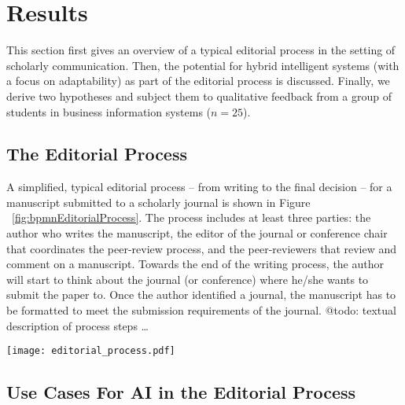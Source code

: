 \section{Results}
\label{sec:results}

This section first gives an overview of a typical editorial process in the setting of scholarly communication. Then, the potential
for hybrid intelligent systems (with a focus on adaptability) as part of the editorial process is discussed. Finally, we derive two
hypotheses and subject them to qualitative feedback from a group of students in business information systems ($n = 25$).

\subsection{The Editorial Process}

A simplified, typical editorial process -- from writing to the final decision -- for a manuscript submitted to a scholarly journal is shown in
Figure ~\ref{fig:bpmnEditorialProcess}. The process includes at least three parties: the author who writes the manuscript, the editor of the
journal or conference chair that coordinates the peer-review process, and the peer-reviewers that review and comment on a manuscript. Towards
the end of the writing process, the author will start to think about the journal (or conference) where he/she wants to submit the paper to.
Once the author identified a journal, the manuscript has to be formatted to meet the submission requirements of the journal. 
{\color{purple} @todo: textual description of process steps \dots}

\begin{figure*}[htb]
    \centering
    \texttt{[image: editorial\_process.pdf]}
    \caption{A simplified, typical editorial process from writing the manuscript to the final decision of acceptance or
    rejection for publication (in BPMN 2.0). For better understanding, the process steps performed by outside parties 
    are also modelled and the process starts with the outside party (author) writing the manuscript. The numbers
    indicate the sequence flow of the process.}
    \label{fig:bpmnEditorialProcess}
\end{figure*}

\subsection{Use Cases For AI in the Editorial Process}

